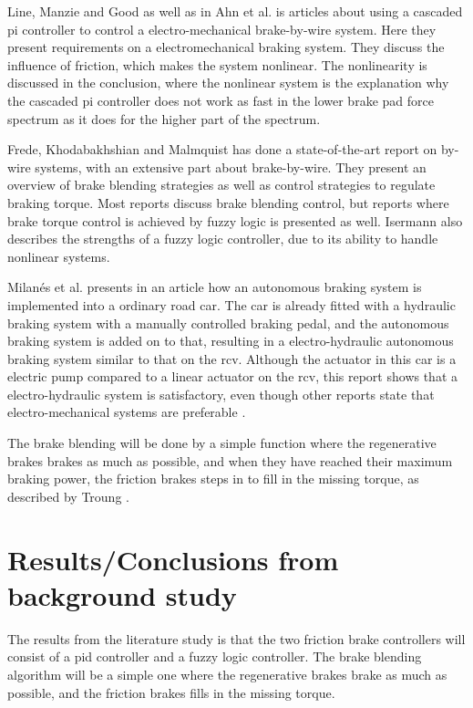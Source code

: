 \documentclass[a4paper,11pt]{kth-mag}
\begin{document}
Line, Manzie and Good \cite{2004-01-2050} as well as in Ahn et al. \cite{ahn2009analysis} is articles about using a cascaded \gls{pi} controller to control a electro-mechanical brake-by-wire system. Here they present requirements on a electromechanical braking system. They discuss the influence of friction, which makes the system nonlinear. The nonlinearity is discussed in the conclusion, where the nonlinear system is the explanation why the cascaded pi controller does not work as fast in the lower brake pad force spectrum as it does for the higher part of the spectrum. \newline



Frede, Khodabakhshian and Malmquist \cite{Frede460614} has done a state-of-the-art report on by-wire systems, with an extensive part about brake-by-wire. They present an overview of brake blending strategies as well as control strategies to regulate braking torque. Most reports discuss brake blending control, but reports where  brake torque control is achieved by fuzzy logic is presented as well. Isermann \cite{661149} also describes the strengths of a fuzzy logic controller, due to its ability to handle nonlinear systems. \newline

Milan{\'e}s et al. \cite{milanes2010electro} presents in an article how an autonomous braking system is implemented into a ordinary road car. The car is already fitted with a hydraulic braking system with a manually controlled braking pedal, and the autonomous braking system is added on to that, resulting in a electro-hydraulic autonomous braking system similar to that on the \gls{rcv}. 
Although the actuator in this car is a electric pump compared to a linear actuator on the \gls{rcv}, this report shows that a electro-hydraulic system is satisfactory, even though other reports state that electro-mechanical systems are preferable \cite{MechatronicsBook} \cite{Xiang}. \newline

The brake blending will be done by a simple function where the regenerative brakes brakes as much as possible, and when they have reached their maximum braking power, the friction brakes steps in to fill in the missing torque, as described by Troung \cite{truongdevelopment}. \newline


\section{Results/Conclusions from background study}
The results from the literature study is that the two friction brake controllers will consist of a \gls{pid} controller and a fuzzy logic controller. 
The brake blending algorithm will be a simple one where the regenerative brakes brake as much as possible, and the friction brakes fills in the missing torque. 
\end{document}
